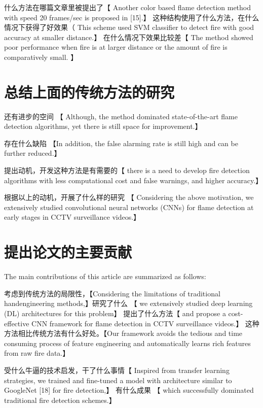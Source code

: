 \documentclass[UTF8]{ctexart}
\begin{document}
		什么方法在哪篇文章里被提出了【 Another color based flame detection
		method with speed 20 frames/sec is proposed in [15].】  这种结构使用了什么方法，在什么情况下获得了好效果（ This
		scheme used SVM classifier to detect fire with good accuracy
		at smaller distance.】 在什么情况下效果比较差【  The method showed poor performance
		when fire is at larger distance or the amount of fire is comparatively
		small.	】
		
		\section{总结上面的传统方法的研究}
		还有进步的空间 【 Although, the method dominated
		state-of-the-art flame detection algorithms, yet there is still space for improvement.】
		
		存在什么缺陷 【In addition, the false alarming rate
		is still high and can be further reduced.】
		
		提出动机，开发这种方法是有需要的【 there is a need to develop fire detection
		algorithms with less computational cost and false warnings,
		and higher accuracy.】
		
		
	    根据以上的动机，开展了什么样的研究 【 Considering the above motivation, we
		extensively studied convolutional neural networks (CNNs)
		for flame detection at early stages in CCTV surveillance
		videos.】
		
		\section{提出论文的主要贡献}
		The main contributions of this article are summarized
		as follows:
		
		考虑到传统方法的局限性，【Considering the limitations of traditional handengineering
		methods,】研究了什么 【 we  extensively studied deep learning
		(DL) architectures for this problem】  提出了什么方法【 and propose a
		cost-effective CNN framework for flame detection in
		CCTV surveillance videos.】 这种方法相比传统方法有什么好处。【Our framework avoids the
		tedious and time consuming process of feature engineering
		and automatically learns rich features from raw fire
		data.】
		
		受什么牛逼的技术启发，干了什么事情【 Inspired from transfer learning strategies, we trained
		and fine-tuned a model with architecture similar to
		GoogleNet [18] for fire detection,】 有什么成果 【 which successfully
		dominated traditional fire detection schemes.】
		
\end{document}
